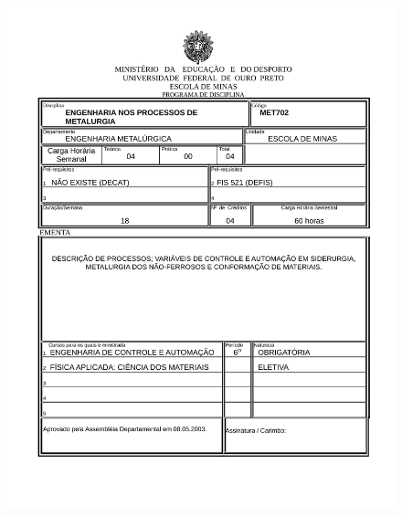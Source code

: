\begin{figure}[p]
	\centering 
	\includegraphics[scale=0.7]{capitulos/anexo1-programas-disciplina/p102.pdf}
\end{figure}

